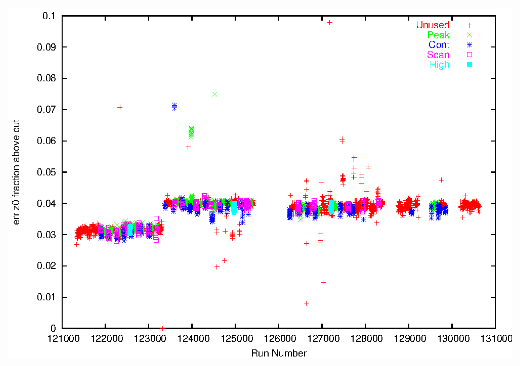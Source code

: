 \documentclass[12pt]{article}
\begin{document}
\mbox{ }

\vfill
\includegraphics[height=0.9\linewidth, angle=90]{fracerrz0.eps}

\vfill
\pagebreak
\end{document}
